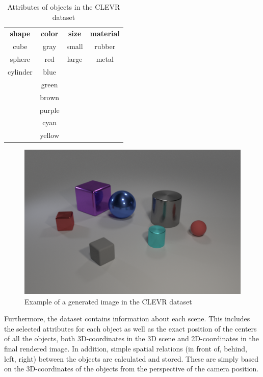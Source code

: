 \begin{table}[h]
    \centering
    \begin{tabular}{cccc}
        \toprule
        \textbf{ shape } & \textbf{ color } & \textbf{ size } & \textbf{ material } \\
        cube             & gray             & small           & rubber              \\
        sphere           & red              & large           & metal               \\
        cylinder         & blue                                                     \\
                         & green                                                    \\
                         & brown                                                    \\
                         & purple                                                   \\
                         & cyan                                                     \\
                         & yellow                                                   \\
        \bottomrule
    \end{tabular}
    \caption{Attributes of objects in the CLEVR dataset}
    \label{tab:clevr-attributes}
\end{table}

\begin{figure}[h]
    \centering
    \includegraphics[width=.8\linewidth]{figures/CLEVR_example.png}
    \caption{Example of a generated image in the CLEVR dataset}
    \label{fig:clevr-example}
\end{figure}

Furthermore, the dataset contains information about each scene. This includes the selected attributes for each object as well as the exact position of the centers of all the objects, both 3D-coordinates in the 3D scene and 2D-coordinates in the final rendered image. In addition, simple spatial relations (in front of, behind, left, right) between the objects are calculated and stored. These are simply based on the 3D-coordinates of the objects from the perspective of the camera position.

